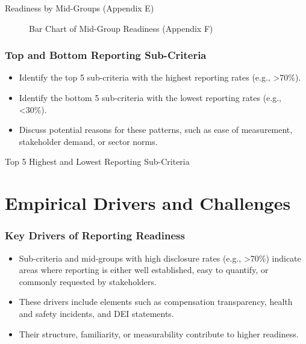 \begin{table}[H]
    \centering
    \caption{Readiness by Mid-Groups (Appendix E)}
\end{table}

\begin{figure}[H]
    \centering
    \caption{Bar Chart of Mid-Group Readiness (Appendix F)}
\end{figure}

\subsubsection{Top and Bottom Reporting Sub-Criteria}
\begin{itemize}
    \item Identify the top 5 sub-criteria with the highest reporting rates (e.g., >70\%).
    \item Identify the bottom 5 sub-criteria with the lowest reporting rates (e.g., <30\%).
    \item Discuss potential reasons for these patterns, such as ease of measurement, stakeholder demand, or sector norms.
\end{itemize}

\begin{table}[H]
    \centering
    \caption{Top 5 Highest and Lowest Reporting Sub-Criteria}
\end{table}

\section{Empirical Drivers and Challenges}
\subsubsection{Key Drivers of Reporting Readiness}
\begin{itemize}
    \item Sub-criteria and mid-groups with high disclosure rates (e.g., >70\%) 
    indicate areas where reporting is either well established, easy to quantify, or commonly requested by stakeholders. 
    \item These drivers include elements such as compensation transparency, health and safety incidents, and DEI statements. 
    \item Their structure, familiarity, or measurability contribute to higher readiness.
\end{itemize}

